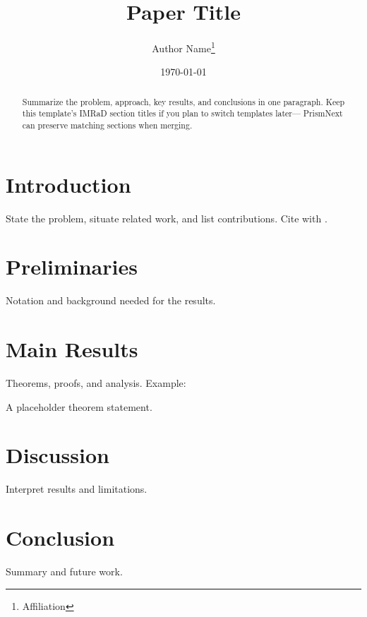 \documentclass[11pt]{article}
\title{Paper Title}
\author{Author Name\thanks{Affiliation}}
\date{\today}
\begin{document}
\maketitle

\begin{abstract}
  Summarize the problem, approach, key results, and conclusions in one paragraph.
  Keep this template's IMRaD section titles if you plan to switch templates later—
  PrismNext can preserve matching sections when merging.
\end{abstract}

\section{Introduction}
\label{sec:introduction}

State the problem, situate related work, and list contributions.
Cite with \cite{key}.

\section{Preliminaries}
\label{sec:preliminaries}

Notation and background needed for the results.

\section{Main Results}
\label{sec:results}

Theorems, proofs, and analysis. Example:

\begin{theorem}
  A placeholder theorem statement.
\end{theorem}

\section{Discussion}
\label{sec:discussion}

Interpret results and limitations.

\section{Conclusion}
\label{sec:conclusion}

Summary and future work.

\printbibliography
\end{document}
